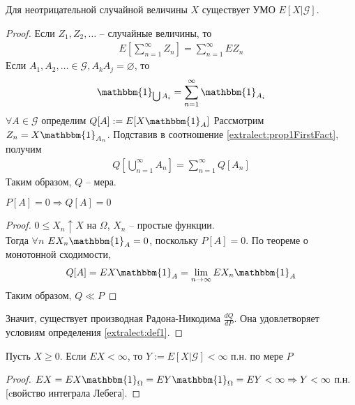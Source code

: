         \begin{prop}\label{extralect:prop1}
            Для неотрицательной случайной величины $X$ существует УМО $E[X|\mathcal{G}]$.
        \end{prop}
        \begin{proof}
            Если $Z_1, Z_2, \ldots$ -- случайные величины, то 
            \begin{eqnarray}\label{extralect:prop1FirstFact}
                E\left[\sum\limits_{n=1}^{\infty}Z_n\right]=\sum\limits_{n=1}^{\infty}E Z_n
            \end{eqnarray}
            Если $A_1, A_2, \ldots \in \mathcal{G}, A_k A_j=\varnothing$, то
            \begin{eqnarray}\label{extralect:prop1SecondFact}
                \mathbbm{1}_{\bigcup{A_i}} = \sum\limits_{n=1}^{\infty}\mathbbm{1}_{A_i}
            \end{eqnarray}
            $\forall A \in \mathcal{G}$ определим $Q[A]:=E[X\mathbbm{1}_{A}]$
            Рассмотрим $Z_n=X\mathbbm{1}_{A_n}$. Подставив в соотношение \ref{extralect:prop1FirstFact}, получим
            \begin{eqnarray}
                Q\left[\bigcup\limits_{n=1}^{\infty}A_n\right]=\sum\limits_{n=1}^{\infty}Q[A_n]
            \end{eqnarray}
            Таким образом, $Q$ -- мера. 
            \begin{prop}\label{extralect:prop2}
                $P[A]=0 \Rightarrow Q[A]=0$
            \end{prop}
            \begin{proof}
                $0\leqslant X_n\uparrow X$ на $\Omega$, $X_n$ -- простые функции.\\
                 Тогда $\forall n$ $EX_n\mathbbm{1}_{A}=0$, поскольку $P[A]=0$. По теореме о монотонной сходимости,
                 \begin{eqnarray}
                    Q[A] = EX\mathbbm{1}_{A} = \lim_{n\to\infty} E X_n\mathbbm{1}_{A}
                \end{eqnarray} 
                Таким образом, $Q\ll P$
            \end{proof}
            Значит, существует производная Радона-Никодима $\frac{dQ}{dP}$. Она удовлетворяет условиям определения \ref{extralect:def1}.
        \end{proof}

        \begin{prop}\label{extralect:prop3}
            Пусть $X\ge0$. Если $EX < \infty$, то $Y:=E[X|\mathcal{G}]<\infty$ п.н. по мере $P$
        \end{prop}
        \begin{proof}
            $EX = EX\mathbbm{1}_{\Omega} = EY\mathbbm{1}_{\Omega} = EY < \infty \Rightarrow Y < \infty$ п.н. [cвойство интеграла Лебега].
        \end{proof}

